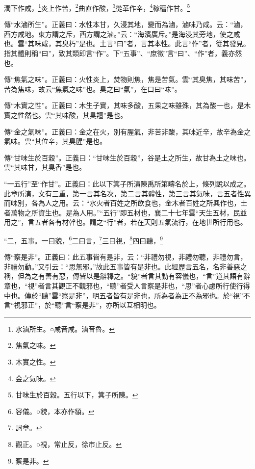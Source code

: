 潤下作咸，\footnote{水滷所生。○咸音咸。滷音魯。}炎上作苦，\footnote{焦氣之味。}曲直作酸，\footnote{木實之性。}從革作辛，\footnote{金之氣味。}稼穡作甘。\footnote{甘味生於百穀。五行以下，箕子所陳。}

{\noindent\zhuan{}\fzbyks 傳“水滷所生”。正義曰：水性本甘，久浸其地，變而為滷，滷味乃咸。云：“滷，西方咸地。東方謂之斥，西方謂之滷。”云：“海濱廣斥。”是海浸其旁地，使之咸也。雲“其味咸，其臭朽”是也。土言“曰”者，言其本性。此言“作”者，從其發見。指其體則稱“曰”，致其類即言“作”。下“五事”、“庶徵”言“曰”、“作”者，義亦然也。 \par}

{\noindent\zhuan{}\fzbyks 傳“焦氣之味”。正義曰：火性炎上，焚物則焦，焦是苦氣。雲“其臭焦，其味苦”，苦為焦味，故云“焦氣之味”也。臭之曰“氣”，在口曰“味”。 \par}

{\noindent\zhuan{}\fzbyks 傳“木實之性”。正義曰：木生子實，其味多酸，五果之味雖殊，其為酸一也，是木實之性然也。雲“其味酸，其臭羶”是也。 \par}

{\noindent\zhuan{}\fzbyks 傳“金之氣味”。正義曰：金之在火，別有腥氣，非苦非酸，其味近辛，故辛為金之氣味。雲“其位辛，其臭腥”是也。 \par}

{\noindent\zhuan{}\fzbyks 傳“甘味生於百穀”。正義曰：“甘味生於百穀”，谷是土之所生，故甘為土之味也。雲“其味甘，其臭香”是也。 \par}

{\noindent\shu{}\fzkt “一五行”至“作甘”。正義曰：此以下箕子所演陳禹所第疇名於上，條列說以成之。此章所演，文有三重，第一言其名次，第二言其體性，第三言其氣味，言五者性異而味別，各為人之用。云：“水火者百姓之所飲食也，金木者百姓之所興作也，土者萬物之所資生也。是為人用。”“五行”即五材也，襄二十七年雲“天生五材，民並用之”，言五者各有材幹也。謂之“行”者，若在天則五氣流行，在地世所行用也。 \par}

“二，五事。一曰貌，\footnote{容儀。○貌，本亦作䫉。}二曰言，\footnote{詞章。}三曰視，\footnote{觀正。○視，常止反，徐市止反。}四曰聽，\footnote{察是非。}


{\noindent\zhuan{}\fzbyks 傳“察是非”。正義曰：此五事皆有是非，云：“非禮勿視，非禮勿聽，非禮勿言，非禮勿動。”又引云：“思無邪。”故此五事皆有是非也。此經歷言五名，名非善惡之稱，但為之有善有惡，傳皆以是辭釋之。“貌”者言其動有容儀也，“言”道其語有辭章也，“視”者言其觀正不觀邪也，“聽”者受人言察是非也，“思”者心慮所行使行得中也。傳於“聽”雲“察是非”，明五者皆有是非也，所為者為正不為邪也。於“視”不言“視邪正”，於“聽”言“察是非”，亦所以互相明也。 \par}

